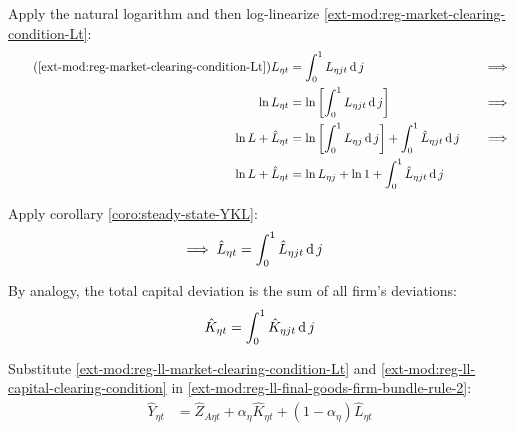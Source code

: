 \documentclass[../thesis.tex]{subfiles}
\begin{document}
Apply the natural logarithm and then log-linearize \ref{ext-mod:reg-market-clearing-condition-Lt}:
\begin{alignat}{2}
	\tag{\ref{ext-mod:reg-market-clearing-condition-Lt}}
	L_{\eta t} &= \int_{0}^{1} L_{\eta jt} \dif j &\implies \\
	\ln L_{\eta t} &= \ln \left[ \int_{0}^{1} L_{\eta jt} \dif j \right] &\implies \nonumber \\
	\ln L + \hat{L}_{\eta t} &= \ln \left[ \int_{0}^{1} L_{\eta j} \dif j \right] + \int_{0}^{1} \hat{L}_{\eta jt} \dif j \quad &\implies \nonumber \\
	\ln L + \hat{L}_{\eta t} &= \ln L_{\eta j} + \ln 1 + \int_{0}^{1} \hat{L}_{\eta jt} \dif j \nonumber
\end{alignat}

Apply corollary \ref{coro:steady-state-YKL}:
\begin{align}
	\implies \hat{L}_{\eta t} &= \int_{0}^{1} \hat{L}_{\eta jt} \operatorname{d} j \label{ext-mod:reg-ll-market-clearing-condition-Lt}
\end{align}

	By analogy, the total capital deviation is the sum of all firm's deviations:
\begin{align}
	\hat{K}_{\eta t} = \int_{0}^{1} \hat{K}_{\eta jt} \operatorname{d} j \label{ext-mod:reg-ll-capital-clearing-condition}
\end{align}

Substitute \ref{ext-mod:reg-ll-market-clearing-condition-Lt} and \ref{ext-mod:reg-ll-capital-clearing-condition} in \ref{ext-mod:reg-ll-final-goods-firm-bundle-rule-2}:
\begin{align}
	\hat{Y}_{\eta t} &= \hat{Z}_{A\eta t} + {\alpha_{\eta}} \hat{K}_{\eta t} + (1-\alpha_{\eta}) \hat{L}_{\eta t} \label{ext-mod:reg-ll-final-goods-firm-bundle-rule-3}
\end{align}
\end{document}
